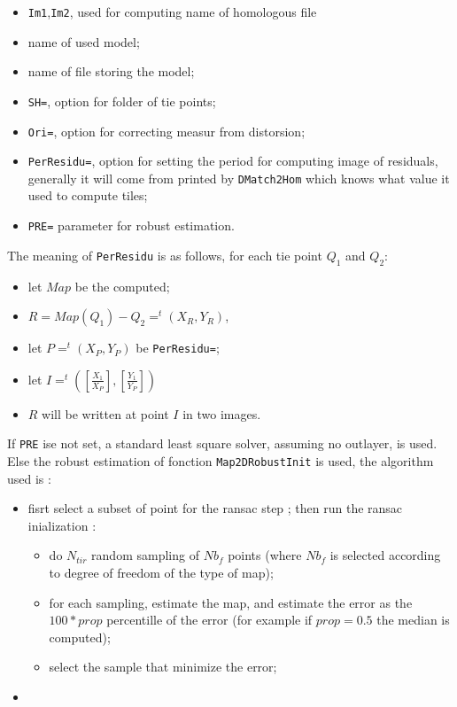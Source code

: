 \begin{itemize}
   \item {\tt Im1},{\tt Im2}, used for computing name of homologous file
   \item name of used model;
   \item name of file storing the model;
   \item {\tt SH=}, option for folder of tie points;
   \item {\tt Ori=}, option for correcting measur from distorsion;
   \item {\tt PerResidu=}, option for setting the period for computing image of residuals, generally
         it will come from printed by {\tt DMatch2Hom} which knows what value it used to compute tiles;
   \item  {\tt PRE=} parameter for robust estimation.
\end{itemize}

The meaning of {\tt PerResidu} is as follows, for each tie point $Q_1$ and $Q_2$:

\begin{itemize}
   \item let $Map$ be the computed;
   \item $R=Map(Q_1)-Q_2=  ^t (X_R,Y_R)$,
   \item let $P=  ^t (X_P,Y_P)$ be {\tt PerResidu=}; 
   \item let $I= ^t ([\frac{X_1}{X_P}],[\frac{Y_1}{Y_P}])$
   \item $R$ will be written at point $I$ in two images.
\end{itemize}


If  {\tt PRE} ise not set, a standard least square solver, assuming no outlayer, is used.
Else the robust estimation of fonction {\tt Map2DRobustInit} is used,
the algorithm used is :

\begin{itemize}
   \item fisrt select a subset of point for the ransac step ;
         then run the ransac inialization :
         \begin{itemize}
             \item  do $N_{tir}$ random sampling of $Nb_f$ points (where $Nb_f$ is
                    selected according to degree of freedom of the type of map);

             \item  for each sampling, estimate the map, and  estimate the error
                    as the $100*prop$ percentille of the error (for example if $prop=0.5$
                    the median is computed);
                    
             \item  select the sample that minimize the error;
         \end{itemize}
   \item 
\end{itemize}




